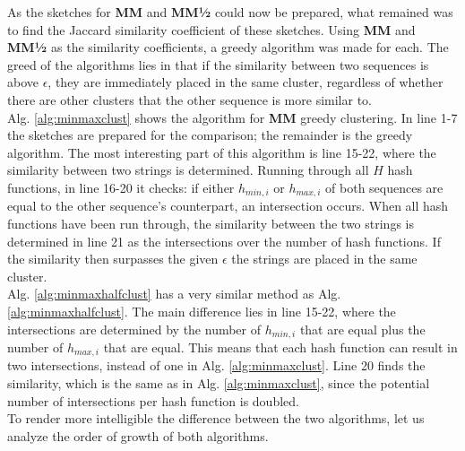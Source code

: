 \documentclass[../../main.tex]{subfiles}
\begin{document}
As the sketches for {\bf MM} and {\bf MM½} could now be prepared, what remained was to find the Jaccard similarity coefficient of these sketches. Using {\bf MM} and {\bf MM½} as the similarity coefficients, a greedy algorithm was made for each. The greed of the algorithms lies in that if the similarity between two sequences is above $\epsilon$, they are immediately placed in the same cluster, regardless of whether there are other clusters that the other sequence is more similar to. \\

Alg. \ref{alg:minmaxclust} shows the algorithm for {\bf MM} greedy clustering. In line 1-7 the sketches are prepared for the comparison; the remainder is the greedy algorithm. The most interesting part of this algorithm is line 15-22, where the similarity between two strings is determined. Running through all $H$ hash functions, in line 16-20 it checks: if either $h_{min,i}$ or $h_{max,i}$ of both sequences are equal to the other sequence's counterpart, an intersection occurs. When all hash functions have been run through, the similarity between the two strings is determined in line 21 as the intersections over the number of hash functions. If the similarity then surpasses the given $\epsilon$ the strings are placed in the same cluster.\\

Alg. \ref{alg:minmaxhalfclust} has a very similar method as Alg. \ref{alg:minmaxhalfclust}. The main difference lies in line 15-22, where the intersections are determined by the number of $h_{min,i}$ that are equal plus the number of $h_{max,i}$ that are equal. This means that each hash function can result in two intersections, instead of one in Alg. \ref{alg:minmaxclust}. Line 20 finds the similarity, which is the same as in Alg. \ref{alg:minmaxclust}, since the potential number of intersections per hash function is doubled.\\

To render more intelligible the difference between the two algorithms, let us analyze the order of growth of both algorithms.
\end{document}
